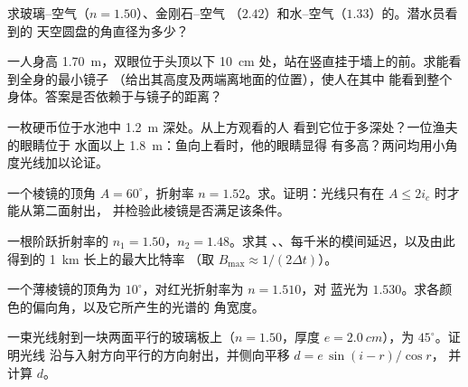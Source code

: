 \begin{exercise}[$\star$]\label{exo:b1:rays-reflection-refraction:3}
求玻璃–空气（$n = 1.50$）、金刚石–空气
（$2.42$）和水–空气（$1.33$）的。潜水员看到的
天空圆盘的角直径为多少？
\end{exercise}

\begin{exercise}[$\star$]\label{exo:b1:rays-reflection-refraction:4}
一人身高 \qty{1.70}{m}，双眼位于头顶以下 \qty{10}{cm}
处，站在竖直挂于墙上的前。求能看到全身的最小镜子
（给出其高度及两端离地面的位置），使人在其中
能看到整个身体。答案是否依赖于与镜子的距离？
\end{exercise}

\begin{exercise}[$\star\star$]\label{exo:b1:rays-reflection-refraction:5}
一枚硬币位于水池中 \qty{1.2}{m} 深处。从上方观看的人
看到它位于多深处？一位渔夫的眼睛位于
水面以上 \qty{1.8}{m}：鱼向上看时，他的眼睛显得
有多高？两问均用小角度光线加以论证。
\end{exercise}

\begin{exercise}[$\star\star$]\label{exo:b1:rays-reflection-refraction:6}
一个棱镜的顶角 $A = 60^\circ$，折射率 $n = 1.52$。求。证明：光线只有在 $A \leq 2 i_c$ 时才能从第二面射出，
并检验此棱镜是否满足该条件。
\end{exercise}

\begin{exercise}[$\star\star$]\label{exo:b1:rays-reflection-refraction:7}
一根阶跃折射率的 $n_1 = 1.50$，$n_2 = 1.48$。求其
、、每千米的模间延迟，以及由此得到的
\qty{1}{km} 长上的最大比特率
（取 $B_{\max} \approx 1/(2\Delta t)$）。
\end{exercise}

\begin{exercise}[$\star\star$]\label{exo:b1:rays-reflection-refraction:8}
一个薄棱镜的顶角为 $10^\circ$，对红光折射率为 $n = 1.510$，对
蓝光为 $1.530$。求各颜色的偏向角，以及它所产生的光谱的
角宽度。
\end{exercise}

\begin{exercise}[$\star\star$]\label{exo:b1:rays-reflection-refraction:9}
一束光线射到一块两面平行的玻璃板上（$n = 1.50$，厚度
$e = \qty{2.0}{cm}$），为 $45^\circ$。证明光线
沿与入射方向平行的方向射出，并侧向平移 $d = e\,\sin(i - r)/\cos r$，
并计算 $d$。
\end{exercise}


